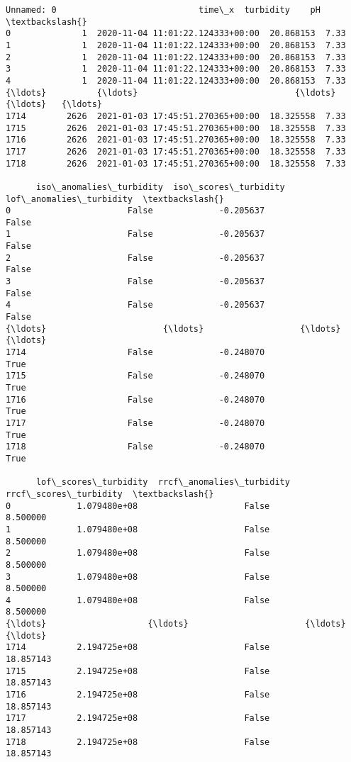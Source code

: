             \begin{tcolorbox}[breakable, size=fbox, boxrule=.5pt, pad at break*=1mm, opacityfill=0]
\begin{Verbatim}[commandchars=\\\{\}]
      Unnamed: 0                            time\_x  turbidity    pH  \textbackslash{}
0              1  2020-11-04 11:01:22.124333+00:00  20.868153  7.33
1              1  2020-11-04 11:01:22.124333+00:00  20.868153  7.33
2              1  2020-11-04 11:01:22.124333+00:00  20.868153  7.33
3              1  2020-11-04 11:01:22.124333+00:00  20.868153  7.33
4              1  2020-11-04 11:01:22.124333+00:00  20.868153  7.33
{\ldots}          {\ldots}                               {\ldots}        {\ldots}   {\ldots}
1714        2626  2021-01-03 17:45:51.270365+00:00  18.325558  7.33
1715        2626  2021-01-03 17:45:51.270365+00:00  18.325558  7.33
1716        2626  2021-01-03 17:45:51.270365+00:00  18.325558  7.33
1717        2626  2021-01-03 17:45:51.270365+00:00  18.325558  7.33
1718        2626  2021-01-03 17:45:51.270365+00:00  18.325558  7.33

      iso\_anomalies\_turbidity  iso\_scores\_turbidity  lof\_anomalies\_turbidity  \textbackslash{}
0                       False             -0.205637                    False
1                       False             -0.205637                    False
2                       False             -0.205637                    False
3                       False             -0.205637                    False
4                       False             -0.205637                    False
{\ldots}                       {\ldots}                   {\ldots}                      {\ldots}
1714                    False             -0.248070                     True
1715                    False             -0.248070                     True
1716                    False             -0.248070                     True
1717                    False             -0.248070                     True
1718                    False             -0.248070                     True

      lof\_scores\_turbidity  rrcf\_anomalies\_turbidity  rrcf\_scores\_turbidity  \textbackslash{}
0             1.079480e+08                     False               8.500000
1             1.079480e+08                     False               8.500000
2             1.079480e+08                     False               8.500000
3             1.079480e+08                     False               8.500000
4             1.079480e+08                     False               8.500000
{\ldots}                    {\ldots}                       {\ldots}                    {\ldots}
1714          2.194725e+08                     False              18.857143
1715          2.194725e+08                     False              18.857143
1716          2.194725e+08                     False              18.857143
1717          2.194725e+08                     False              18.857143
1718          2.194725e+08                     False              18.857143


\end{Verbatim}
\end{tcolorbox}
